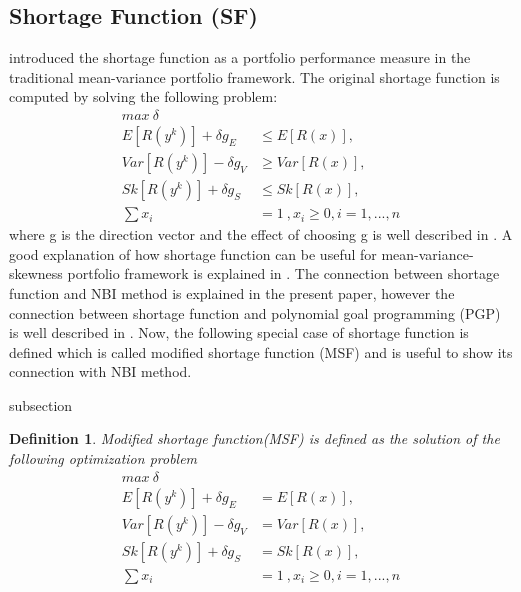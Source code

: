 \documentclass[12pt,a4paper]{article}
\numberwithin{equation}{section}
\begin{document}
\subsection{Shortage Function (SF)}
\citep{Briec2004} introduced the shortage function as a portfolio performance measure in the traditional mean-variance portfolio framework.
The original shortage function is computed by solving the following problem:
\begin{equation}  \label{eq-SF}
\begin{split}
max \ \delta \\  
E[R(y^{k})]+\delta g_{E}&\leq E[R(x)] , \\
Var[R(y^{k})]-\delta g_{V} &\geq Var[R(x)] , \\
Sk[R(y^{k})]+\delta g_{S}&\leq Sk[R(x)] , \\
\sum x_i&=1 \ ,x_{i}\geq 0 , i=1,...,n
\end{split}
\end{equation}
where g is the direction vector and the effect of choosing g is well described in \citep{Kerstens2012}. A good explanation of how shortage function can be useful for mean-variance-skewness portfolio framework is explained in \citep{Briec2007}. The connection between shortage function and NBI method is explained in the present paper, however the connection between shortage function and polynomial goal programming (PGP) is well described in \citep{Briec2013}. 
Now, the following special case of shortage function is defined which is called modified shortage function (MSF) and is useful to show its connection with NBI method.
\renewcommand{\thesubsection}{\arabic{subsection}}
\newtheorem{MSFdefinition}{Definition}{subsection}
\begin{MSFdefinition}{Modified shortage function(MSF) is defined as the solution of the following optimization problem}\label{MSFdefinition}
\begin{equation}  \label{eq-MSF}
\begin{split}
max \ \delta \\  
E[R(y^{k})]+\delta g_{E}&= E[R(x)] , \\
Var[R(y^{k})]-\delta g_{V} &= Var[R(x)] , \\
Sk[R(y^{k})]+\delta g_{S}&= Sk[R(x)] , \\
\sum x_i&=1 \ ,x_{i}\geq 0 , i=1,...,n
\end{split}
\end{equation}
\end{MSFdefinition}
\end{document}
